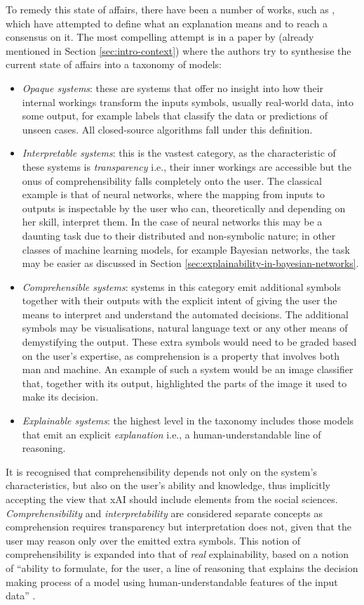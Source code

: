 To remedy this state of affairs, there have been a number of works, such as \citep{doshi2017towards}, which have attempted to define what an explanation means and to reach a consensus on it.
The most compelling attempt is in a paper by \citet{Doran2018} (already mentioned in Section \ref{sec:intro-context}) where the authors try to synthesise the current state of affairs into a taxonomy of models:
\begin{itemize}
	\item \textit{Opaque systems}: these are systems that offer no insight into how their internal workings transform the inputs symbols, usually real-world data, into some output, for example labels that classify the data or predictions of unseen cases. 
		All closed-source algorithms fall under this definition.
	\item \textit{Interpretable systems}: this is the vastest category, as the characteristic of these systems is \textit{transparency} i.e., their inner workings are accessible but the onus of comprehensibility falls completely onto the user.  
		The classical example is that of neural networks, where the mapping from inputs to outputs is inspectable by the user who can, theoretically and depending on her skill, interpret them.
		In the case of neural networks this may be a daunting task due to their distributed and non-symbolic nature; in other classes of machine learning models, for example Bayesian networks, the task may be easier as discussed in Section \ref{sec:explainability-in-bayesian-networks}.
	\item \textit{Comprehensible systems}: systems in this category emit additional symbols together with their outputs with the explicit intent of giving the user the means to interpret and understand the automated decisions.
		The additional symbols may be visualisations, natural language text or any other means of demystifying the output.  
		These extra symbols would need to be graded based on the user's expertise, as comprehension is a property that involves both man and machine.
		An example of such a system would be an image classifier that, together with its output, highlighted the parts of the image it used to make its decision.
	\item \textit{Explainable systems}: the highest level in the taxonomy includes those models that emit an explicit \textit{explanation} i.e., a human-understandable line of reasoning.
\end{itemize}
It is recognised that comprehensibility depends not only on the system's characteristics, but also on the user's ability and knowledge, thus implicitly accepting the view that xAI should include elements from the social sciences.
\textit{Comprehensibility} and \textit{interpretability} are considered separate concepts as comprehension requires transparency but interpretation does not, given that the user may reason only over the emitted extra symbols.
This notion of comprehensibility is expanded into that of \textit{real} explainability, based on a notion of \enquote{ability to formulate, for the user, a line of reasoning that explains the decision making process of a model using human-understandable features of the input data} \citep{Doran2018}.

